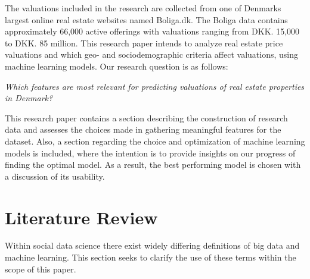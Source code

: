 \documentclass[12pt,a4paper]{article}
\begin{document}
The valuations included in the research are collected from one of Denmarks largest online real estate websites named Boliga.dk. The Boliga data contains approximately 66,000 active offerings with valuations ranging from DKK. 15,000 to DKK. 85 million. This research paper intends to analyze real estate price valuations and which geo- and sociodemographic criteria affect valuations, using machine learning models. Our research question is as follows: 
\begin{center}
 \textit{Which features are most relevant for predicting valuations of real estate properties in Denmark?}
\end{center}
This research paper contains a section describing the construction of research data and assesses the choices made in gathering meaningful features for the dataset. Also, a section regarding the choice and optimization of machine learning models is included, where the intention is to provide insights on our progress of finding the optimal model. As a result, the best performing model is chosen with a discussion of its usability. 

\section{Literature Review}
Within social data science there exist widely differing definitions of big data and machine learning. This section seeks to clarify the use of these terms within the scope of this paper.
\end{document}
